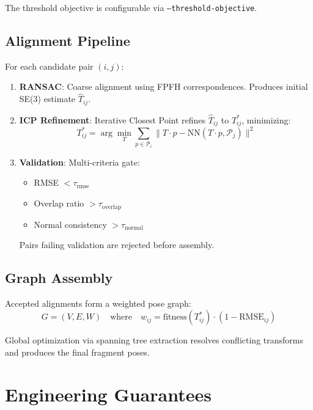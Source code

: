 \documentclass[11pt,a4paper]{article}
\begin{document}
The threshold objective is configurable via \texttt{--threshold-objective}.

\subsection{Alignment Pipeline}

For each candidate pair $(i, j)$:
\begin{enumerate}
    \item \textbf{RANSAC}: Coarse alignment using FPFH correspondences. Produces initial SE(3) estimate $\hat{T}_{ij}$.
    \item \textbf{ICP Refinement}: Iterative Closest Point refines $\hat{T}_{ij}$ to $T_{ij}^*$, minimizing:
    \begin{equation}
        T_{ij}^* = \arg\min_T \sum_{p \in \mathcal{P}_i} \| T \cdot p - \text{NN}(T \cdot p, \mathcal{P}_j) \|^2
    \end{equation}
    \item \textbf{Validation}: Multi-criteria gate:
    \begin{itemize}
        \item RMSE $< \tau_\text{rmse}$
        \item Overlap ratio $> \tau_\text{overlap}$
        \item Normal consistency $> \tau_\text{normal}$
    \end{itemize}
    Pairs failing validation are rejected before assembly.
\end{enumerate}

\subsection{Graph Assembly}

Accepted alignments form a weighted pose graph:
\begin{equation}
    G = (V, E, W) \quad \text{where} \quad w_{ij} = \text{fitness}(T_{ij}^*) \cdot (1 - \text{RMSE}_{ij})
\end{equation}

Global optimization via spanning tree extraction resolves conflicting transforms and produces the final fragment poses.

\section{Engineering Guarantees}
\end{document}
